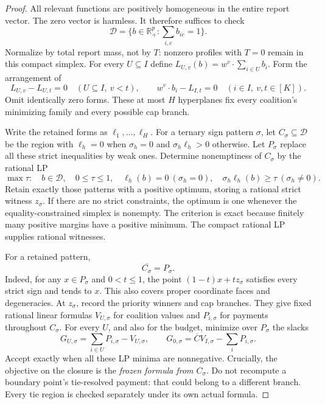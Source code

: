 \documentclass[11pt]{article}
\theoremstyle{definition}\newtheorem{definition}[theorem]{Definition}
\theoremstyle{remark}\newtheorem{remark}[theorem]{Remark}
\newcommand{\R}{\mathbb R}
\begin{document}
\begin{proof}
All relevant functions are positively homogeneous in the entire report
vector.  The zero vector is harmless.  It therefore suffices to check
\[
 \mathcal D=\{b\in\R_+^p:\textstyle\sum_{i,e}b_{ie}=1\}.
\]
Normalize by total report mass, not by $T$: nonzero profiles with $T=0$
remain in this compact simplex.  For every $U\subseteq I$ define
$L_{U,v}(b)=w^v\cdot\sum_{i\in U}b_i$.  Form the arrangement of
\[
 L_{U,v}-L_{U,t}=0\quad(U\subseteq I,\ v<t),\qquad
 w^v\cdot b_i-L_{I,t}=0\quad(i\in I,\ v,t\in[K]).
\]
Omit identically zero forms.  These at most $H$ hyperplanes fix every
coalition's minimizing family and every possible cap branch.

Write the retained forms as $\ell_1,\ldots,\ell_H$.
For a ternary sign pattern $\sigma$, let $C_\sigma\subseteq\mathcal D$
be the region with $\ell_h=0$ when $\sigma_h=0$ and
$\sigma_h\ell_h>0$ otherwise.  Let $P_\sigma$ replace all these strict
inequalities by weak ones.  Determine nonemptiness of $C_\sigma$ by the
rational LP
\[
 \max\tau:\quad b\in\mathcal D,\quad0\le\tau\le1,\quad
 \ell_h(b)=0\ (\sigma_h=0),\quad
 \sigma_h\ell_h(b)\ge\tau\ (\sigma_h\ne0).
\]
Retain exactly those patterns with a positive optimum, storing a rational
strict witness $z_\sigma$.  If there are no strict constraints, the optimum
is one whenever the equality-constrained simplex is nonempty.
The criterion is exact because finitely many positive margins have a positive
minimum.  The compact rational LP supplies rational witnesses.

For a retained pattern,
\begin{equation}\label{alg:closure}
 \overline{C_\sigma}=P_\sigma.
\end{equation}
Indeed, for any $x\in P_\sigma$ and $0<t\le1$, the point
$(1-t)x+t z_\sigma$ satisfies every strict sign and tends to $x$.
This also covers proper coordinate faces and degeneracies.
At $z_\sigma$, record the priority winners and cap branches.  They give
fixed rational linear formulas $V_{U,\sigma}$ for coalition values and
$P_{i,\sigma}$ for payments throughout $C_\sigma$.
For every $U$, and also for the budget, minimize over $P_\sigma$ the slacks
\[
 G_{U,\sigma}=\sum_{i\in U}P_{i,\sigma}-V_{U,\sigma},\qquad
 G_{0,\sigma}=\overline C V_{I,\sigma}-\sum_iP_{i,\sigma}.
\]
Accept exactly when all these LP minima are nonnegative.
Crucially, the objective on the closure is the \emph{frozen formula from
$C_\sigma$}.  Do not recompute a boundary point's tie-resolved payment:
that could belong to a different branch.  Every tie region is checked
separately under its own actual formula.


\end{proof}
\end{document}
